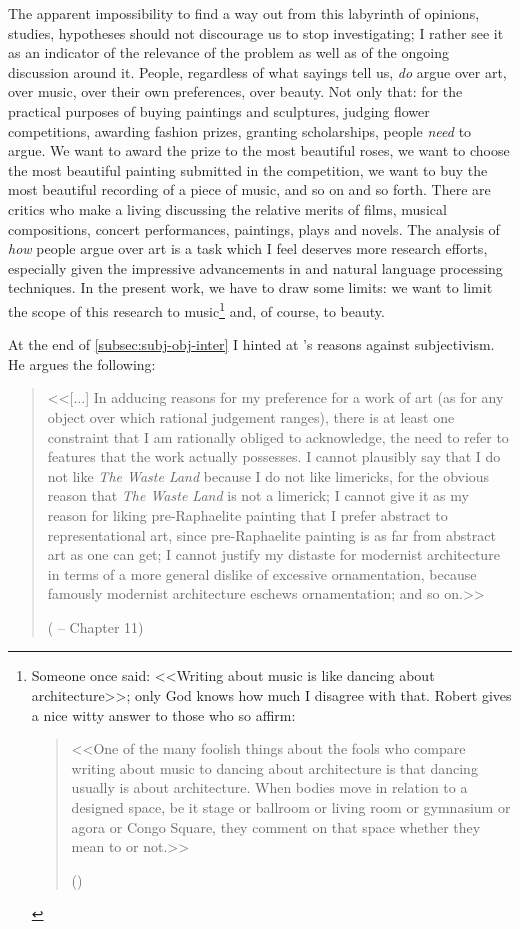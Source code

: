 The apparent impossibility to find a way out from this labyrinth of opinions, studies, hypotheses should not discourage us to stop investigating; I rather see it as an indicator of the relevance of the problem as well as of the ongoing discussion  around it. People, regardless of what sayings tell us, \emph{do} argue over art, over music, over their own preferences, over beauty. Not only that: for the practical purposes of buying paintings and sculptures, judging flower competitions, awarding fashion prizes, granting scholarships, people \emph{need} to argue. We want to award the prize to the most beautiful roses, we want to choose the most beautiful painting submitted in the competition, we want to buy the most beautiful recording of a piece of music, and so on and so forth. There are critics who make a
living discussing the relative merits of films, musical compositions, concert
performances, paintings, plays and novels. The analysis of \emph{how} people argue over art is a task which I feel deserves more research efforts, especially given the impressive advancements in  and natural language processing techniques. In the present work, we have to draw some limits: we want to limit the scope of this research to music\footnote{Someone once said: <<Writing about music is like dancing about architecture>>; only God knows how much I disagree with that. Robert \citeauthor{christgau2005writing} gives a nice witty answer to those who so affirm: 
\begin{quote}
<<One of the many foolish things about the fools who compare writing about music to dancing about architecture is that dancing usually is about architecture. When bodies move in relation to a designed space, be it stage or ballroom or living room or gymnasium or agora or Congo Square, they comment on that space whether they mean to or not.>>

(\cite{christgau2005writing})
\end{quote}} and, of course, to beauty.

At the end of \autoref{subsec:subj-obj-inter} I hinted at \citeauthor{graham2005philosophy}'s reasons against subjectivism. He argues the following:
\begin{quote}
<<[...] In adducing reasons for my preference for a work of art (as for any object over which rational judgement ranges), there is at least one constraint that I am rationally obliged to acknowledge, the need to refer to features that the work actually possesses. I cannot plausibly say that I do not like \emph{The Waste Land} because I do not like limericks, for the obvious reason that \emph{The Waste Land} is not a limerick; I cannot give it as my reason for liking pre-Raphaelite painting that I prefer abstract to representational art, since pre-Raphaelite painting is as far from abstract art as one can get; I cannot justify my distaste for modernist architecture in terms of a more general dislike of excessive ornamentation, because famously modernist architecture eschews ornamentation; and so on.>>

(\cite{graham2005philosophy} -- Chapter 11)
\end{quote}

